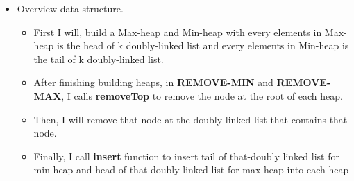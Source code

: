 \documentclass{article}
\begin{document}
\begin{itemize}
		\item Overview data structure.
		\begin{itemize}
			\item First I will, build a Max-heap and Min-heap with every elements in Max-heap is the head of k doubly-linked list and every elements in Min-heap is the tail of k doubly-linked list.
			\item After finishing building heaps, in \textbf{REMOVE-MIN} and \textbf{REMOVE-MAX}, I calls \textbf{removeTop} to remove the node at the root of each heap.
			\item Then, I will remove that node at the doubly-linked list that contains that node.
			\item Finally, I call \textbf{insert} function to insert tail of that-doubly linked list for min heap and head of that doubly-linked list for max heap into each heap  
		\end{itemize}
	\end{itemize}
\end{document}
